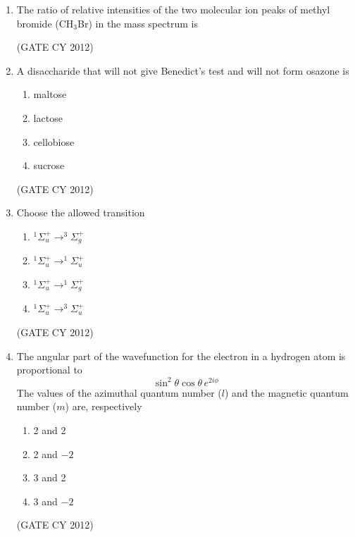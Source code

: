\documentclass[12pt]{article}
\begin{document}
\begin{enumerate}
\item The ratio of relative intensities of the two molecular ion peaks of methyl bromide (CH$_3$Br) in the mass spectrum is  

\begin{enumerate}
\end{enumerate}
\hfill (GATE CY 2012)

\item A disaccharide that will not give Benedict’s test and will not form osazone is  
\begin{multicols}{2}
\begin{enumerate}
    \item maltose
    \item lactose
    \item cellobiose
    \item sucrose
\end{enumerate}
\end{multicols}
\hfill (GATE CY 2012)

\item Choose the allowed transition  
\begin{multicols}{2}
\begin{enumerate}
    \item $^{1}\Sigma_{u}^{+} \rightarrow ^{3}\Sigma_{g}^{+}$
    \item $^{1}\Sigma_{u}^{+} \rightarrow ^{1}\Sigma_{u}^{+}$
    \item $^{1}\Sigma_{u}^{+} \rightarrow ^{1}\Sigma_{g}^{+}$
    \item $^{1}\Sigma_{u}^{+} \rightarrow ^{3}\Sigma_{u}^{+}$
\end{enumerate}
\end{multicols}
\hfill (GATE CY 2012)

\item The angular part of the wavefunction for the electron in a hydrogen atom is proportional to  
\[
\sin^2 \theta \cos \theta \, e^{2i\phi}
\]  
The values of the azimuthal quantum number ($l$) and the magnetic quantum number ($m$) are, respectively  
\begin{multicols}{2}
\begin{enumerate}
    \item 2 and 2
    \item 2 and $-2$
    \item 3 and 2
    \item 3 and $-2$
\end{enumerate}
\end{multicols}
\hfill (GATE CY 2012)


\end{enumerate}
\end{document}
